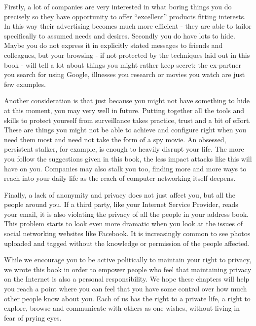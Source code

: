 Firstly, a lot of companies are very interested in what boring things
you do precisely so they have opportunity to offer ``excellent''
products fitting interests. In this way their advertising becomes much
more efficient - they are able to tailor specifically to assumed needs
and desires. Secondly you do have lots to hide. Maybe you do not express
it in explicitly stated messages to friends and colleagues, but your
browsing - if not protected by the techniques laid out in this book -
will tell a lot about things you might rather keep secret: the
ex-partner you search for using Google, illnesses you research or movies
you watch are just few examples.

Another consideration is that just because you might not have something
to hide at this moment, you may very well in future. Putting together
all the tools and skills to protect yourself from surveillance takes
practice, trust and a bit of effort. These are things you might not be
able to achieve and configure right when you need them most and need not
take the form of a spy movie. An obsessed, persistent stalker, for
example, is enough to heavily disrupt your life. The more you follow the
suggestions given in this book, the less impact attacks like this will
have on you. Companies may also stalk you too, finding more and more
ways to reach into your daily life as the reach of computer networking
itself deepens.

Finally, a lack of anonymity and privacy does not just affect you, but
all the people around you. If a third party, like your Internet Service
Provider, reads your email, it is also violating the privacy of all the
people in your address book. This problem starts to look even more
dramatic when you look at the issues of social networking websites like
Facebook. It is increasingly common to see photos uploaded and tagged
without the knowledge or permission of the people affected.

While we encourage you to be active politically to maintain your right
to privacy, we wrote this book in order to empower people who feel that
maintaining privacy on the Internet is also a personal responsibility.
We hope these chapters will help you reach a point where you can feel
that you have some control over how much other people know about you.
Each of us has the right to a private life, a right to explore, browse
and communicate with others as one wishes, without living in fear of
prying eyes.
